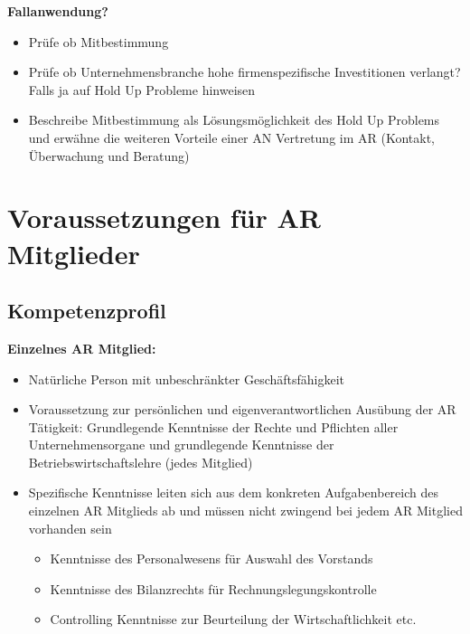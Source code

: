 \documentclass[
]{article}
\providecommand{\tightlist}{%
  \setlength{\itemsep}{0pt}\setlength{\parskip}{0pt}}
\begin{document}
\textbf{Fallanwendung? }

\begin{itemize}
\tightlist
\item
  Prüfe ob Mitbestimmung
\item
  Prüfe ob Unternehmensbranche hohe firmenspezifische Investitionen
  verlangt? Falls ja auf Hold Up Probleme hinweisen
\item
  Beschreibe Mitbestimmung als Lösungsmöglichkeit des Hold Up Problems
  und erwähne die weiteren Vorteile einer AN Vertretung im AR (Kontakt,
  Überwachung und Beratung)
\end{itemize}

\hypertarget{voraussetzungen-fuxfcr-ar-mitglieder}{%
\section{Voraussetzungen für AR
Mitglieder}\label{voraussetzungen-fuxfcr-ar-mitglieder}}

\hypertarget{kompetenzprofil}{%
\subsection{Kompetenzprofil}\label{kompetenzprofil}}

\textbf{Einzelnes AR Mitglied:}

\begin{itemize}
\item
  Natürliche Person mit unbeschränkter Geschäftsfähigkeit
\item
  Voraussetzung zur persönlichen und eigenverantwortlichen Ausübung der
  AR Tätigkeit: Grundlegende Kenntnisse der Rechte und Pflichten aller
  Unternehmensorgane und grundlegende Kenntnisse der
  Betriebswirtschaftslehre (jedes Mitglied)
\item
  Spezifische Kenntnisse leiten sich aus dem konkreten Aufgabenbereich
  des einzelnen AR Mitglieds ab und müssen nicht zwingend bei jedem AR
  Mitglied vorhanden sein

  \begin{itemize}
  \tightlist
  \item
    Kenntnisse des Personalwesens für Auswahl des Vorstands
  \item
    Kenntnisse des Bilanzrechts für Rechnungslegungskontrolle
  \item
    Controlling Kenntnisse zur Beurteilung der Wirtschaftlichkeit etc.
  \end{itemize}
\end{itemize}
\end{document}
